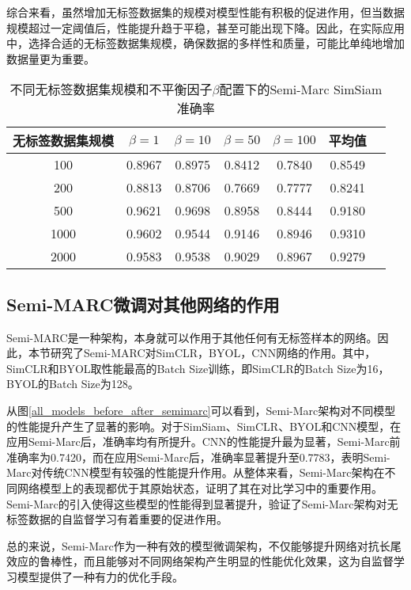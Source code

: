 \documentclass[master]{thesis-uestc}
\begin{document}
综合来看，虽然增加无标签数据集的规模对模型性能有积极的促进作用，但当数据规模超过一定阈值后，性能提升趋于平稳，甚至可能出现下降。因此，在实际应用中，选择合适的无标签数据集规模，确保数据的多样性和质量，可能比单纯地增加数据量更为重要。

\begin{table}[h]
    \centering
    \caption{不同无标签数据集规模和不平衡因子$\beta$配置下的Semi-Marc SimSiam准确率}
    \begin{tabular}{ccccccc}
    \hline
    \textbf{无标签数据集规模} & \textbf{$\beta = 1$} & \textbf{$\beta = 10$} & \textbf{$\beta = 50$} & \textbf{$\beta = 100$} & \textbf{平均值} \\
    \hline
    100   & 0.8967 & 0.8975 & 0.8412 & 0.7840 & 0.8549 \\
    200   & 0.8813 & 0.8706 & 0.7669 & 0.7777 & 0.8241 \\
    500   & 0.9621 & 0.9698 & 0.8958 & 0.8444 & 0.9180 \\
    1000  & 0.9602 & 0.9544 & 0.9146 & 0.8946 & 0.9310 \\
    2000  & 0.9583 & 0.9538 & 0.9029 & 0.8967 & 0.9279 \\
    \hline
    \end{tabular}
    \label{tab:semi_marc_ssv_size}
\end{table}

\subsection{Semi-MARC微调对其他网络的作用}
Semi-MARC是一种架构，本身就可以作用于其他任何有无标签样本的网络。因此，本节研究了Semi-MARC对SimCLR，BYOL，CNN网络的作用。其中，SimCLR和BYOL取性能最高的Batch Size训练，即SimCLR的Batch Size为16，BYOL的Batch Size为128。

从图\ref{all_models_before_after_semimarc}可以看到，Semi-Marc架构对不同模型的性能提升产生了显著的影响。对于SimSiam、SimCLR、BYOL和CNN模型，在应用Semi-Marc后，准确率均有所提升。CNN的性能提升最为显著，Semi-Marc前准确率为0.7420，而在应用Semi-Marc后，准确率显著提升至0.7783，表明Semi-Marc对传统CNN模型有较强的性能提升作用。从整体来看，Semi-Marc架构在不同网络模型上的表现都优于其原始状态，证明了其在对比学习中的重要作用。Semi-Marc的引入使得这些模型的性能得到显著提升，验证了Semi-Marc架构对无标签数据的自监督学习有着重要的促进作用。

总的来说，Semi-Marc作为一种有效的模型微调架构，不仅能够提升网络对抗长尾效应的鲁棒性，而且能够对不同网络架构产生明显的性能优化效果，这为自监督学习模型提供了一种有力的优化手段。
\end{document}
